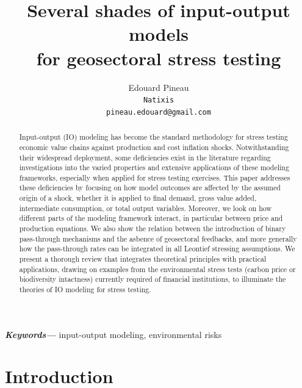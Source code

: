 \documentclass{article}
\date{}
\title{Several shades of input-output models \\ for geosectoral stress testing}
\author{
  Edouard Pineau \\
  \texttt{Natixis}\\
  \texttt{pineau.edouard@gmail.com}
}
\providecommand{\keywords}[1]
{
  \small	
  \textbf{\textit{Keywords---}} #1
}
\begin{document}
\maketitle


\begin{abstract}
\noindent Input-output (IO) modeling has become the standard methodology for stress testing economic value chains against production and cost inflation shocks. Notwithstanding their widespread deployment, some deficiencies exist in the literature regarding investigations into the varied properties and extensive applications of these modeling frameworks, especially when applied for stress testing exercises. This paper addresses these deficiencies by focusing on how model outcomes are affected by the assumed origin of a shock, whether it is applied to final demand, gross value added, intermediate consumption, or total output variables. Moreover, we look on how different parts of the modeling framework interact, in particular between price and production equations. We also show the relation between the introduction of binary pass-through mechanisms and the asbence of geosectoral feedbacks, and more generally how the pass-through rates can be integrated in all Leontief stressing assumptions. 
We present a thorough review that integrates theoretical principles with practical applications, drawing on examples from the environmental stress tests (carbon price or biodiversity intactness) currently required of financial institutions, to illuminate the theories of IO modeling for stress testing.
\end{abstract}

\noindent \keywords{input-output modeling, environmental risks}

\section{Introduction}
\label{sec:introduction}
\end{document}
